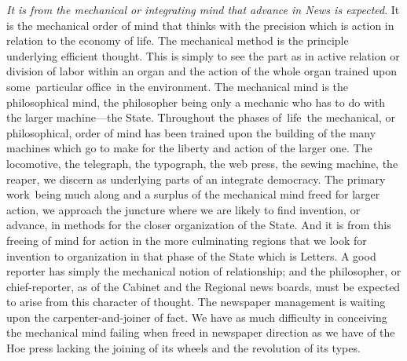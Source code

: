 \documentclass[twoside,symmetric,nobib,justified]{tufte-book}
\begin{document}
\emph{It is from the mechanical or integrating mind that advance in News
is expected}. It is the mechanical order of mind that thinks with the
precision which is action in relation to the economy of life. The
mechanical method is the principle underlying efficient thought. This is
simply to see the part as in active relation or division of labor within
an organ and the action of the whole organ trained upon some~particular
office~in the environment. The mechanical mind is the philosophical
mind, the philosopher being only a mechanic who has to do with the
larger machine---the State. Throughout the phases of~life~the
mechanical, or philosophical, order of mind has been trained upon the
building of the many machines which go to make for the liberty and
action of the larger one. The locomotive, the telegraph, the typograph,
the web press, the sewing machine, the reaper, we discern as underlying
parts of an integrate democracy. The primary work~being much along and a
surplus of the mechanical mind freed for larger action, we approach the
juncture where we are likely to find invention, or advance, in methods
for the closer organization of the State. And it is from this freeing of
mind for action in the more culminating regions that we look for
invention to organization in that phase of the State which is Letters. A
good reporter has simply the mechanical notion of relationship; and the
philosopher, or chief-reporter, as of the Cabinet and the Regional news
boards, must be expected to arise from this character of thought. The
newspaper management is waiting upon the carpenter-and-joiner of fact.
We have as much difficulty in conceiving the mechanical mind failing
when freed in newspaper direction as we have of the Hoe press lacking
the joining of its wheels and the revolution of its types.~

\vspace{0.05in}
\end{document}
